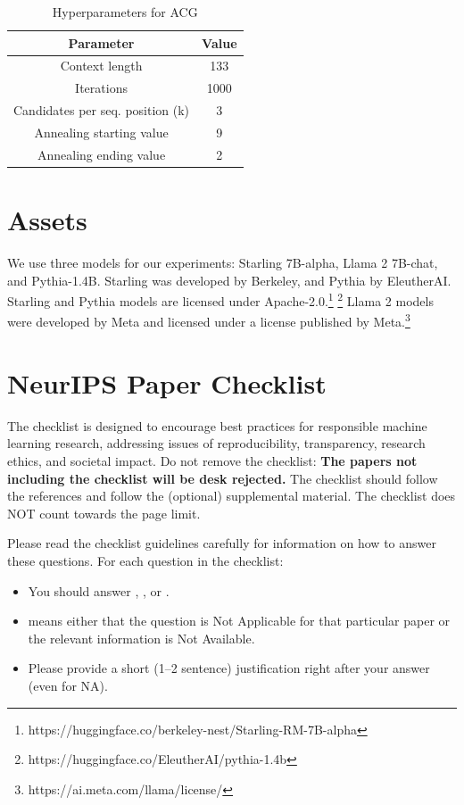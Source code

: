 \documentclass{article}
\begin{document}
\begin{table}
    \centering
    \caption{Hyperparameters for ACG}
    \label{tableh}
    \begin{tabular}{|c|c|}
        \hline
        Parameter & Value \\
        \hline
        Context length & 133 \\
        \hline
        Iterations & 1000 \\
        \hline
        Candidates per seq. position (k) & 3 \\
        \hline
        Annealing starting value & 9 \\
        \hline
        Annealing ending value & 2 \\
        \hline
    \end{tabular}
\end{table}

\section{Assets}

We use three models for our experiments: Starling 7B-alpha, Llama 2 7B-chat, and Pythia-1.4B. Starling was developed by Berkeley, and Pythia by EleutherAI. Starling and Pythia models are licensed under Apache-2.0.\footnote{https://huggingface.co/berkeley-nest/Starling-RM-7B-alpha} \footnote{https://huggingface.co/EleutherAI/pythia-1.4b} Llama 2 models were developed by Meta and licensed under a license published by Meta.\footnote{https://ai.meta.com/llama/license/} 


\newpage
\section*{NeurIPS Paper Checklist}

The checklist is designed to encourage best practices for responsible machine learning research, addressing issues of reproducibility, transparency, research ethics, and societal impact. Do not remove the checklist: {\bf The papers not including the checklist will be desk rejected.} The checklist should follow the references and follow the (optional) supplemental material.  The checklist does NOT count towards the page
limit. 

Please read the checklist guidelines carefully for information on how to answer these questions. For each question in the checklist:
\begin{itemize}
    \item You should answer \answerYes{}, \answerNo{}, or \answerNA{}.
    \item \answerNA{} means either that the question is Not Applicable for that particular paper or the relevant information is Not Available.
    \item Please provide a short (1–2 sentence) justification right after your answer (even for NA). 
\end{itemize}
\end{document}
